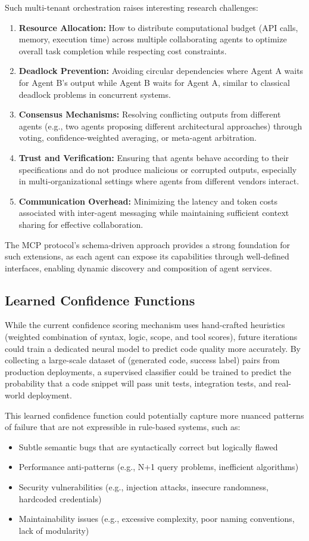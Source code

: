 \documentclass[lettersize,journal]{IEEEtran}
\begin{document}
Such multi-tenant orchestration raises interesting research challenges:
\begin{enumerate}
    \item \textbf{Resource Allocation:} How to distribute computational budget (API calls, memory, execution time) across multiple collaborating agents to optimize overall task completion while respecting cost constraints.
    \item \textbf{Deadlock Prevention:} Avoiding circular dependencies where Agent A waits for Agent B's output while Agent B waits for Agent A, similar to classical deadlock problems in concurrent systems.
    \item \textbf{Consensus Mechanisms:} Resolving conflicting outputs from different agents (e.g., two agents proposing different architectural approaches) through voting, confidence-weighted averaging, or meta-agent arbitration.
    \item \textbf{Trust and Verification:} Ensuring that agents behave according to their specifications and do not produce malicious or corrupted outputs, especially in multi-organizational settings where agents from different vendors interact.
    \item \textbf{Communication Overhead:} Minimizing the latency and token costs associated with inter-agent messaging while maintaining sufficient context sharing for effective collaboration.
\end{enumerate}

The MCP protocol's schema-driven approach provides a strong foundation for such extensions, as each agent can expose its capabilities through well-defined interfaces, enabling dynamic discovery and composition of agent services.

\subsection{Learned Confidence Functions}
While the current confidence scoring mechanism uses hand-crafted heuristics (weighted combination of syntax, logic, scope, and tool scores), future iterations could train a dedicated neural model to predict code quality more accurately. By collecting a large-scale dataset of (generated code, success label) pairs from production deployments, a supervised classifier could be trained to predict the probability that a code snippet will pass unit tests, integration tests, and real-world deployment.

This learned confidence function could potentially capture more nuanced patterns of failure that are not expressible in rule-based systems, such as:
\begin{itemize}
    \item Subtle semantic bugs that are syntactically correct but logically flawed
    \item Performance anti-patterns (e.g., N+1 query problems, inefficient algorithms)
    \item Security vulnerabilities (e.g., injection attacks, insecure randomness, hardcoded credentials)
    \item Maintainability issues (e.g., excessive complexity, poor naming conventions, lack of modularity)
\end{itemize}
\end{document}

